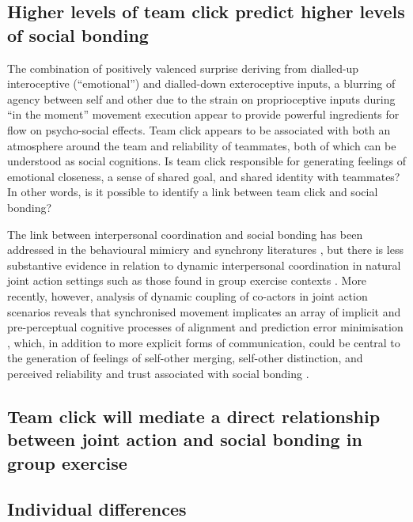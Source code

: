 \begin{CJK}{UTF8}{gbsn}
\subsection{Higher levels of team click predict higher levels of social bonding \label{sect:teamClickSocialBonding}}

The combination of positively valenced surprise deriving from dialled-up interoceptive (``emotional'') and dialled-down exteroceptive inputs, a blurring of agency between self and other due to the strain on proprioceptive inputs during ``in the moment'' movement execution appear to provide powerful ingredients for flow on psycho-social effects.  Team click appears to be associated with both an atmosphere around the team and reliability of teammates, both of which can be understood as social cognitions.  Is team click responsible for generating feelings of emotional closeness, a sense of shared goal, and shared identity with teammates?  In other words, is it possible to identify a link between team click and social bonding?

The link between interpersonal coordination and social bonding has been addressed in the behavioural mimicry and synchrony literatures \citep[e.g.,][]{Wheatley2012,Launay2016,Mogan2017}, but there is less substantive evidence in relation to dynamic interpersonal coordination in natural joint action settings such as those found in group exercise contexts \citep{Marsh2009,Miles2009,Lumsden2012}.  More recently, however, analysis of dynamic coupling of co-actors in joint action scenarios reveals that synchronised movement implicates an array of implicit and pre-perceptual cognitive processes of alignment and prediction error minimisation \citep{Schmidt2011}, which, in addition to more explicit forms of communication, could be central to the generation of feelings of self-other merging, self-other distinction, and perceived reliability and trust associated with social bonding \citep{Marsh2009}.




\subsection{Team click will mediate a direct relationship between joint action and social bonding in group exercise\label{sect:JASuccessSocialBonding}}




\subsection{Individual differences}





\end{CJK}
